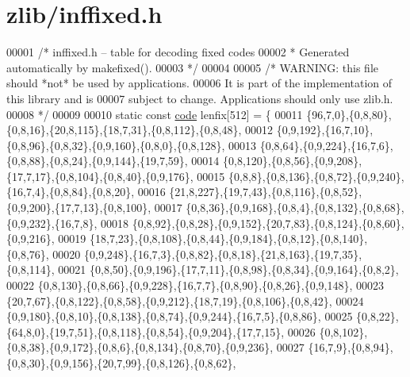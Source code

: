 \hypertarget{zlib_2inffixed_8h_source}{}\section{zlib/inffixed.h}
\label{zlib_2inffixed_8h_source}

\begin{DoxyCode}
00001     \textcolor{comment}{/* inffixed.h -- table for decoding fixed codes}
00002 \textcolor{comment}{     * Generated automatically by makefixed().}
00003 \textcolor{comment}{     */}
00004 
00005     \textcolor{comment}{/* WARNING: this file should *not* be used by applications.}
00006 \textcolor{comment}{       It is part of the implementation of this library and is}
00007 \textcolor{comment}{       subject to change. Applications should only use zlib.h.}
00008 \textcolor{comment}{     */}
00009 
00010     \textcolor{keyword}{static} \textcolor{keyword}{const} \hyperlink{structcode}{code} lenfix[512] = \{
00011         \{96,7,0\},\{0,8,80\},\{0,8,16\},\{20,8,115\},\{18,7,31\},\{0,8,112\},\{0,8,48\},
00012         \{0,9,192\},\{16,7,10\},\{0,8,96\},\{0,8,32\},\{0,9,160\},\{0,8,0\},\{0,8,128\},
00013         \{0,8,64\},\{0,9,224\},\{16,7,6\},\{0,8,88\},\{0,8,24\},\{0,9,144\},\{19,7,59\},
00014         \{0,8,120\},\{0,8,56\},\{0,9,208\},\{17,7,17\},\{0,8,104\},\{0,8,40\},\{0,9,176\},
00015         \{0,8,8\},\{0,8,136\},\{0,8,72\},\{0,9,240\},\{16,7,4\},\{0,8,84\},\{0,8,20\},
00016         \{21,8,227\},\{19,7,43\},\{0,8,116\},\{0,8,52\},\{0,9,200\},\{17,7,13\},\{0,8,100\},
00017         \{0,8,36\},\{0,9,168\},\{0,8,4\},\{0,8,132\},\{0,8,68\},\{0,9,232\},\{16,7,8\},
00018         \{0,8,92\},\{0,8,28\},\{0,9,152\},\{20,7,83\},\{0,8,124\},\{0,8,60\},\{0,9,216\},
00019         \{18,7,23\},\{0,8,108\},\{0,8,44\},\{0,9,184\},\{0,8,12\},\{0,8,140\},\{0,8,76\},
00020         \{0,9,248\},\{16,7,3\},\{0,8,82\},\{0,8,18\},\{21,8,163\},\{19,7,35\},\{0,8,114\},
00021         \{0,8,50\},\{0,9,196\},\{17,7,11\},\{0,8,98\},\{0,8,34\},\{0,9,164\},\{0,8,2\},
00022         \{0,8,130\},\{0,8,66\},\{0,9,228\},\{16,7,7\},\{0,8,90\},\{0,8,26\},\{0,9,148\},
00023         \{20,7,67\},\{0,8,122\},\{0,8,58\},\{0,9,212\},\{18,7,19\},\{0,8,106\},\{0,8,42\},
00024         \{0,9,180\},\{0,8,10\},\{0,8,138\},\{0,8,74\},\{0,9,244\},\{16,7,5\},\{0,8,86\},
00025         \{0,8,22\},\{64,8,0\},\{19,7,51\},\{0,8,118\},\{0,8,54\},\{0,9,204\},\{17,7,15\},
00026         \{0,8,102\},\{0,8,38\},\{0,9,172\},\{0,8,6\},\{0,8,134\},\{0,8,70\},\{0,9,236\},
00027         \{16,7,9\},\{0,8,94\},\{0,8,30\},\{0,9,156\},\{20,7,99\},\{0,8,126\},\{0,8,62\},

\end{DoxyCode}
